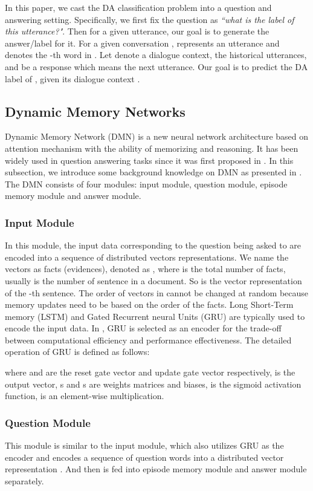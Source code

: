 \documentclass[conference]{IEEEtran}
\begin{document}
In this paper, we cast the DA classification problem into a question and answering setting. Specifically, we first fix the question as \textit{``what is the label of this utterance?"}. Then for a given utterance, our goal is to generate the answer/label for it. For a given conversation ,  represents an utterance and  denotes the -th word in . Let  denote a dialogue context, the  historical utterances, and  be a response which means the next utterance. Our goal is to predict the DA label of , given its dialogue context .
	
	\subsection{Dynamic Memory Networks}
	Dynamic Memory Network (DMN) is a new neural network architecture based on attention mechanism with the ability of memorizing and reasoning. It has been widely used in question answering tasks since it was first proposed in \cite{kumar2016ask}. In this subsection, we introduce some background knowledge on DMN as presented in \cite{kumar2016ask}. The DMN consists of four modules: input module, question module, episode memory module and answer module. 
	
	\subsubsection{Input Module}
	In this module, the input data corresponding to the question being asked to are encoded into a sequence of distributed vectors representations. We name the vectors as facts (evidences), denoted as , where  is the total number of facts, usually is the number of sentence in a document. So  is the vector representation of the -th sentence. The order of vectors in  cannot be changed at random because memory updates need to be based on the order of the facts. Long Short-Term memory (LSTM) \cite{Hochreiter:1997:LSM:1246443.1246450} and Gated Recurrent neural Units (GRU) \cite{chung2014empirical} are typically used to encode the input data. In \cite{kumar2016ask}, GRU is selected as an encoder for the trade-off between computational efficiency and performance effectiveness. 
	The detailed operation of GRU is defined as follows:
	
	where  and  are the reset gate vector and update gate vector respectively,  is the output vector, s and s are weights matrices and biases,  is the sigmoid activation function,  is an element-wise multiplication. 
	\subsubsection{Question Module}
	This module is similar to the input module, which also utilizes GRU as the encoder and encodes a sequence of question words into a distributed vector representation . And then  is fed into episode memory module and answer module separately. 
\end{document}
